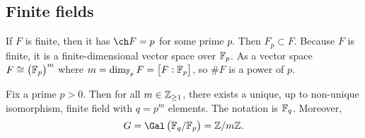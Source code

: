 \pagebreak

\subsection{Finite fields}


If $ F $ is finite, then it has $ \ch F = p $ for some prime $ p $. Then $ F_p \subset F $. Because $ F $ is finite, it is a finite-dimensional vector space over $ \mathbb{F}_p $. As a vector space $ F \cong \br{\FF_p}^m $ where $ m = \dim_{\FF_p} F = \sbr{F : \FF_p} $, so $ \#F $ is a power of $ p $.

\begin{theorem}
Fix a prime $ p > 0 $. Then for all $ m \in \mathbb{Z}_{\ge 1} $, there exists a unique, up to non-unique isomorphism, finite field with $ q = p^m $ elements. The notation is $ \mathbb{F}_q $. Moreover,
$$ G = \Gal\br{\FF_q / \FF_p} = \ZZ / m\ZZ. $$
\end{theorem}

